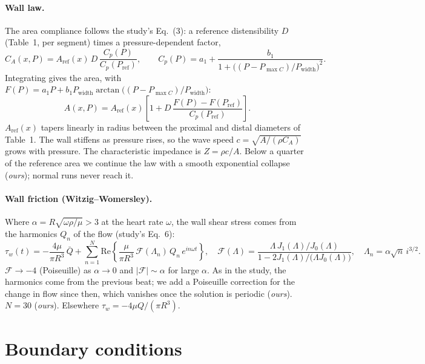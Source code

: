 \documentclass[10pt]{article}
\begin{document}
\paragraph{Wall law.} The area compliance follows the study's Eq.~(3): a reference distensibility $D$ (Table~1, per
segment) times a pressure-dependent factor,
\begin{equation}
C_A(x,P) = A_{\mathrm{ref}}(x)\,D\,\frac{C_p(P)}{C_p(P_{\mathrm{ref}})},\qquad
C_p(P) = a_1 + \frac{b_1}{1+\big((P-P_{\max C})/P_{\mathrm{width}}\big)^2}.
\end{equation}
Integrating gives the area, with $F(P) = a_1P + b_1P_{\mathrm{width}}\arctan\!\big((P-P_{\max C})/P_{\mathrm{width}}\big)$:
\begin{equation}
A(x,P) = A_{\mathrm{ref}}(x)\left[1 + D\,\frac{F(P)-F(P_{\mathrm{ref}})}{C_p(P_{\mathrm{ref}})}\right].
\end{equation}
$A_{\mathrm{ref}}(x)$ tapers linearly in radius between the proximal and distal diameters of Table~1. The wall stiffens as
pressure rises, so the wave speed $c=\sqrt{A/(\rho C_A)}$ grows with pressure. The characteristic impedance is $Z=\rho c/A$.
Below a quarter of the reference area we continue the law with a smooth exponential collapse (\emph{ours}); normal runs
never reach it.

\paragraph{Wall friction (Witzig--Womersley).} Where $\alpha=R\sqrt{\omega\rho/\mu}>3$ at the heart rate $\omega$, the
wall shear stress comes from the harmonics $Q_n$ of the flow (study's Eq.~6):
\begin{equation}
\tau_w(t) = -\frac{4\mu}{\pi R^3}\,\bar Q + \sum_{n=1}^{N}\mathrm{Re}\!\left\{\frac{\mu}{\pi R^3}\,
\mathcal F(\Lambda_n)\,Q_n\,e^{in\omega t}\right\},\quad
\mathcal F(\Lambda)=\frac{\Lambda\,J_1(\Lambda)/J_0(\Lambda)}{1-2J_1(\Lambda)/\big(\Lambda J_0(\Lambda)\big)},\quad
\Lambda_n=\alpha\sqrt{n}\,i^{3/2}.
\end{equation}
$\mathcal F\to-4$ (Poiseuille) as $\alpha\to0$ and $|\mathcal F|\sim\alpha$ for large $\alpha$. As in the study, the
harmonics come from the previous beat; we add a Poiseuille correction for the change in flow since then, which
vanishes once the solution is periodic (\emph{ours}). $N=30$ (\emph{ours}). Elsewhere $\tau_w=-4\mu Q/(\pi R^3)$.

\section{Boundary conditions}
\end{document}
